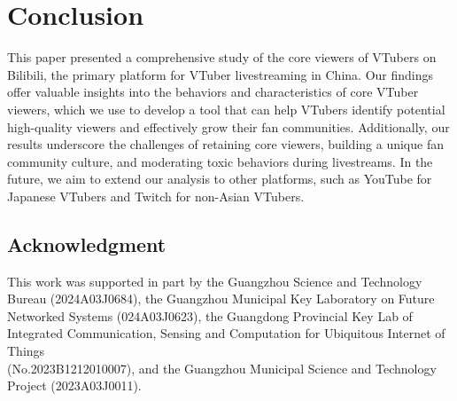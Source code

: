 \section{Conclusion}

This paper presented a comprehensive study of the core viewers of VTubers on Bilibili, the primary platform for VTuber livestreaming in China. Our findings offer valuable insights into the behaviors and characteristics of core VTuber viewers, which we use to develop a tool that can help VTubers identify potential high-quality viewers and effectively grow their fan communities. Additionally, our results underscore the challenges of retaining core viewers, building a unique fan community culture, and moderating toxic behaviors during livestreams. In the future, we aim to extend our analysis to other platforms, such as YouTube for Japanese VTubers and Twitch for non-Asian VTubers.

\subsection*{Acknowledgment}
This work was supported in part by the Guangzhou Science and Technology Bureau (2024A03J0684), the Guangzhou Municipal Key Laboratory on Future Networked Systems (024A03J0623), the Guangdong Provincial Key Lab of Integrated Communication, Sensing and Computation for Ubiquitous Internet of Things \\(No.2023B1212010007), and the Guangzhou Municipal Science and Technology Project (2023A03J0011).